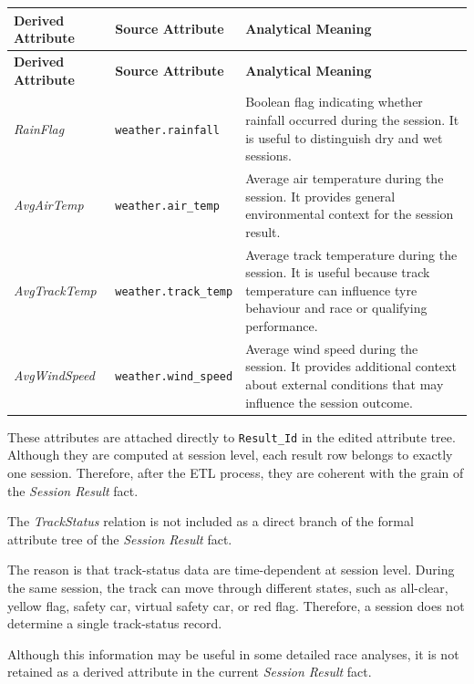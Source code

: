 \documentclass[a4paper,11pt]{article}
\begin{document}
	\begin{longtable}{|p{4.2cm}|p{4.2cm}|p{6.2cm}|}
		\hline
		\textbf{Derived Attribute} & \textbf{Source Attribute} & \textbf{Analytical Meaning} \\
		\hline
		\endfirsthead
		
		\hline
		\textbf{Derived Attribute} & \textbf{Source Attribute} & \textbf{Analytical Meaning} \\
		\hline
		\endhead
		
		\textit{RainFlag}
		& \texttt{weather.rainfall}
		& Boolean flag indicating whether rainfall occurred during the session. It is useful to distinguish dry and wet sessions. \\
		\hline
		
		\textit{AvgAirTemp}
		& \texttt{weather.air\_temp}
		& Average air temperature during the session. It provides general environmental context for the session result. \\
		\hline
		
		\textit{AvgTrackTemp}
		& \texttt{weather.track\_temp}
		& Average track temperature during the session. It is useful because track temperature can influence tyre behaviour and race or qualifying performance. \\
		\hline
		
		\textit{AvgWindSpeed}
		& \texttt{weather.wind\_speed}
		& Average wind speed during the session. It provides additional context about external conditions that may influence the session outcome. \\
		\hline
	\end{longtable}
	
	These attributes are attached directly to \texttt{Result\_Id} in the edited attribute tree.
	Although they are computed at session level, each result row belongs to exactly one
	session. Therefore, after the ETL process, they are coherent with the grain of the
	\textit{Session Result} fact.
	


	
	The \textit{TrackStatus} relation is not included as a direct branch of the formal
	attribute tree of the \textit{Session Result} fact.
	
	The reason is that track-status data are time-dependent at session level. During the same
	session, the track can move through different states, such as all-clear, yellow flag,
	safety car, virtual safety car, or red flag. Therefore, a session does not determine a
	single track-status record.
	
	Although this information may be useful in some detailed race analyses, it is not retained
	as a derived attribute in the current \textit{Session Result} fact.
	
\end{document}
